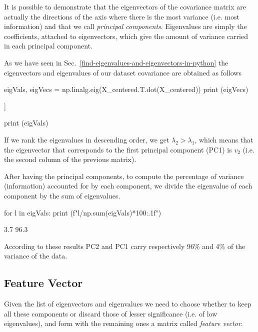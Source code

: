 It is possible to demonstrate that the eigenvectors of the covariance matrix are actually the directions of the axis where there is the most variance (i.e. most information) and that we call \emph{principal components}. Eigenvalues are simply the coefficients, attached to eigenvectors, which give the amount of variance carried in each principal component.

As we have seen in Sec.~\ref{find-eigenvalues-and-eigenvectors-in-python} the eigenvectors and eigenvalues of our dataset covariance are obtained as follows

\begin{ipython}
eigVals, eigVecs = np.linalg.eig(X_centered.T.dot(X_centered))
print (eigVecs)
\end{ipython}
\begin{ioutput}
[[-0.70710678 -0.70710678]
 [ 0.70710678 -0.70710678]]
\end{ioutput}

\begin{ipython}
print (eigVals)
\end{ipython}
\begin{ioutput}
[  7.46600865 192.53399135]
\end{ioutput}

If we rank the eigenvalues in descending order, we get $\lambda_2>\lambda_1$, which means that the eigenvector that corresponds to the first principal component (PC1) is  $v_2$ (i.e. the second column of the previous matrix).

After having the principal components, to compute the percentage of variance (information) accounted for by each component, we divide the eigenvalue of each component by the sum of eigenvalues. 

\begin{ipython}
for l in eigVals:
    print (f"{l/np.sum(eigVals)*100:.1f}")
\end{ipython}
\begin{ioutput}
3.7
96.3
\end{ioutput}

According to these results PC2 and PC1 carry respectively 96\% and 4\% of the variance of the data.

\subsection{Feature Vector}
Given the list of eigenvectors and eigenvalues we need to choose whether to keep all these components or discard those of lesser significance (i.e. of low eigenvalues), and form with the remaining ones a matrix called \emph{feature vector}.

